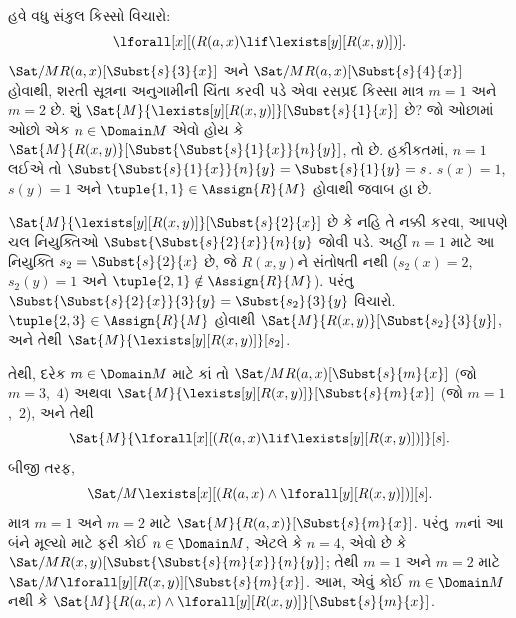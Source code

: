 \begin{ex}
હવે વધુ સંકુલ કિસ્સો વિચારો:
\[
\lforall[x][(R(a,x) \lif \lexists[y][R(x,y)])].
\]
$\Sat/{M}{R(a,x)}[\Subst{s}{3}{x}]$ અને
$\Sat/{M}{R(a,x)}[\Subst{s}{4}{x}]$ હોવાથી, શરતી સૂત્રના અનુગામીની
ચિંતા કરવી પડે એવા રસપ્રદ કિસ્સા માત્ર $m=1$ અને $m=2$ છે. શું
$\Sat{M}{\lexists[y][R(x,y)]}[\Subst{s}{1}{x}]$ છે? જો ઓછામાં ઓછો એક
$n \in \Domain M$ એવો હોય કે
$\Sat{M}{R(x,y)}[\Subst{\Subst{s}{1}{x}}{n}{y}]$, તો છે. હકીકતમાં,
$n=1$ લઈએ તો $\Subst{\Subst{s}{1}{x}}{n}{y}=\Subst{s}{1}{y}=s$.
$s(x)=1$, $s(y)=1$ અને $\tuple{1,1}\in\Assign{R}{M}$ હોવાથી જવાબ હા
છે.

$\Sat{M}{\lexists[y][R(x,y)]}[\Subst{s}{2}{x}]$ છે કે નહિ તે નક્કી
કરવા, આપણે ચલ નિયુક્તિઓ
$\Subst{\Subst{s}{2}{x}}{n}{y}$ જોવી પડે. અહીં $n=1$ માટે આ નિયુક્તિ
$s_2=\Subst{s}{2}{x}$ છે, જે $R(x,y)$ને સંતોષતી નથી ($s_2(x)=2$,
$s_2(y)=1$ અને $\tuple{2,1}\notin\Assign{R}{M}$). પરંતુ
$\Subst{\Subst{s}{2}{x}}{3}{y}=\Subst{s_2}{3}{y}$ વિચારો.
$\tuple{2,3}\in\Assign{R}{M}$ હોવાથી
$\Sat{M}{R(x,y)}[\Subst{s_2}{3}{y}]$, અને તેથી
$\Sat{M}{\lexists[y][R(x,y)]}[s_2]$.

તેથી, દરેક $m \in \Domain M$ માટે કાં તો
$\Sat/{M}{R(a,x)}[\Subst{s}{m}{x}]$ (જો $m=3$,~$4$) અથવા
$\Sat{M}{\lexists[y][R(x,y)]}[\Subst{s}{m}{x}]$ (જો $m=1$,~$2$), અને તેથી
\[
\Sat{M}{\lforall[x][(R(a,x) \lif \lexists[y][R(x,y)])]}[s].
\]
બીજી તરફ,
\[
\Sat/{M}{\lexists[x][(R(a,x) \land \lforall[y][R(x,y)])]}[s].
\]
માત્ર $m=1$ અને $m=2$ માટે
$\Sat{M}{R(a,x)}[\Subst{s}{m}{x}]$. પરંતુ~$m$નાં આ બંને મૂલ્યો માટે
ફરી કોઈ $n \in \Domain M$, એટલે કે $n=4$, એવો છે કે
$\Sat/{M}{R(x,y)}[\Subst{\Subst{s}{m}{x}}{n}{y}]$; તેથી $m=1$ અને
$m=2$ માટે $\Sat/{M}{\lforall[y][R(x,y)]}[\Subst{s}{m}{x}]$. આમ, એવું
કોઈ $m \in \Domain M$ નથી કે
$\Sat{M}{R(a,x) \land \lforall[y][R(x,y)]}[\Subst{s}{m}{x}]$.
\end{ex}









